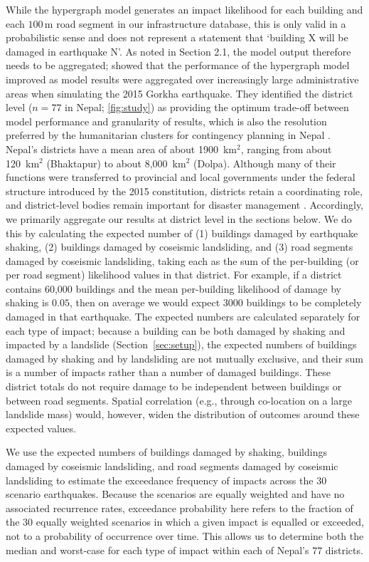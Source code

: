 \documentclass[preprint,12pt,authoryear]{elsarticle}
\begin{document}
While the hypergraph model generates an impact likelihood for each building and each $100\,\text{m}$ road segment in our infrastructure database, this is only valid in a probabilistic sense and does not represent a statement that `building X will be damaged in earthquake N'. As noted in Section 2.1, the model output therefore needs to be aggregated; \cite{Dunant2025} showed that the performance of the hypergraph model improved as model results were aggregated over increasingly large administrative areas when simulating the 2015 Gorkha earthquake. They identified the district level ($n = 77$ in Nepal; \ref{fig:study}) as providing the optimum trade-off between model performance and granularity of results, which is also the resolution preferred by the humanitarian clusters for contingency planning in Nepal \citep{sijapati2025}. Nepal's districts have a mean area of about 1900~km$^2$, ranging from about 120~km$^2$ (Bhaktapur) to about 8,000~km$^2$ (Dolpa). Although many of their functions were transferred to provincial and local governments under the federal structure introduced by the 2015 constitution, districts retain a coordinating role, and district-level bodies remain important for disaster management \citep{Bhandari2020}. Accordingly, we primarily aggregate our results at district level in the sections below. We do this by calculating the expected number of (1) buildings damaged by earthquake shaking, (2) buildings damaged by coseismic landsliding, and (3) road segments damaged by coseismic landsliding, taking each as the sum of the per-building (or per road segment) likelihood values in that district. For example, if a district contains 60,000 buildings and the mean per-building likelihood of damage by shaking is $0.05$, then on average we would expect 3000 buildings to be completely damaged in that earthquake. The expected numbers are calculated separately for each type of impact; because a building can be both damaged by shaking and impacted by a landslide (Section~\ref{sec:setup}), the expected numbers of buildings damaged by shaking and by landsliding are not mutually exclusive, and their sum is a number of impacts rather than a number of damaged buildings. These district totals do not require damage to be independent between buildings or between road segments. Spatial correlation (e.g., through co-location on a large landslide mass) would, however, widen the distribution of outcomes around these expected values.

We use the expected numbers of buildings damaged by shaking, buildings damaged by coseismic landsliding, and road segments damaged by coseismic landsliding to estimate the exceedance frequency of impacts across the 30 scenario earthquakes. Because the scenarios are equally weighted and have no associated recurrence rates, exceedance probability here refers to the fraction of the 30 equally weighted scenarios in which a given impact is equalled or exceeded, not to a probability of occurrence over time. This allows us to determine both the median and worst-case for each type of impact within each of Nepal's 77 districts.
\end{document}
